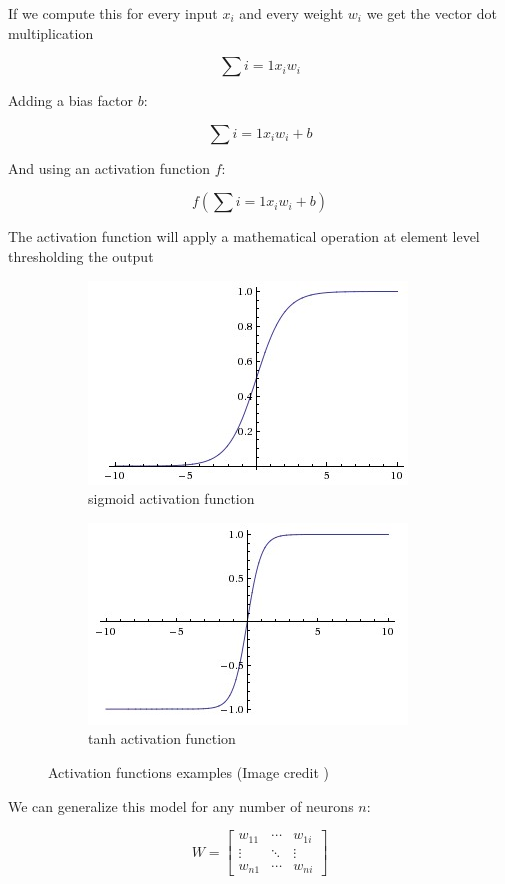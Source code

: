 If we compute this for every input $x_i$ and every weight $w_i$ we get the vector dot multiplication

$$ \sum{i=1} x_i w_i  $$ 

Adding a bias factor $b$:

$$ \sum{i=1} x_i w_i  + b$$ 

And using an activation function $f$:

$$ f(\sum{i=1} x_i w_i + b)  $$ 

The activation function will apply a mathematical operation at element level thresholding the output

\begin{figure}
    \centering
    \begin{subfigure}{.5\textwidth}
        \centering
        \includegraphics[width=.4\linewidth]{Figures/sigmoid}
        \caption{sigmoid activation function}
        \label{fig:sub1}
    \end{subfigure}%
    \begin{subfigure}{.5\textwidth}
        \centering
        \includegraphics[width=.4\linewidth]{Figures/tanh}
        \caption{tanh activation function}
        \label{fig:sub2}
    \end{subfigure}
    \caption{Activation functions examples (Image credit \cite{cs231n})}
    \label{fig:activations}
\end{figure}



We can generalize this model for any number of neurons $n$:

$$
W=\left[
\begin{array}{ccc}
   w_{11} & \cdots & w_{1i} \\
   \vdots & \ddots & \vdots \\
   w_{n1} & \cdots & w_{ni}
\end{array}
\right]
$$

